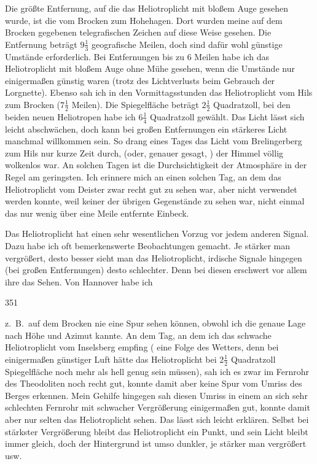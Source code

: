 \par\noindent\hspace*{\parindent}Die größte Entfernung, auf die das Heliotroplicht mit bloßem Auge gesehen wurde, ist die vom Brocken zum Hohehagen. Dort wurden meine auf dem Brocken gegebenen telegrafischen Zeichen auf diese Weise gesehen. Die Entfernung beträgt \(9\frac{1}{3}\) geografische Meilen, doch sind dafür wohl günstige Umstände erforderlich.
Bei Entfernungen bis zu 6 Meilen habe ich das Heliotroplicht mit bloßem Auge ohne Mühe gesehen, wenn die Umstände nur einigermaßen günstig waren (trotz des Lichtverlusts beim Gebrauch der Lorgnette). Ebenso sah ich in den Vormittagsstunden das Heliotroplicht vom Hils zum Brocken (\(7\frac{1}{2}\) Meilen).
Die Spiegelfläche beträgt \(2\frac{1}{2}\) Quadratzoll, bei den beiden neuen Heliotropen habe ich \(6\frac{1}{4}\) Quadratzoll gewählt. Das Licht lässt sich leicht abschwächen, doch kann bei großen Entfernungen ein stärkeres Licht manchmal willkommen sein. So drang eines Tages das Licht vom Brelingerberg zum Hils nur kurze Zeit durch,  (oder, genauer gesagt, ) der Himmel völlig wolkenlos war.
An solchen Tagen ist die Durchsichtigkeit der Atmosphäre in der Regel am geringsten. Ich erinnere mich an einen solchen Tag, an dem das Heliotroplicht vom Deister zwar recht gut zu sehen war, aber nicht verwendet werden konnte, weil keiner der übrigen Gegenstände zu sehen war, nicht einmal das nur wenig über eine Meile entfernte Einbeck.

\par\noindent\hspace*{\parindent}Das Heliotroplicht hat einen sehr wesentlichen Vorzug vor jedem anderen Signal. Dazu habe ich oft bemerkenswerte Beobachtungen gemacht. Je stärker man vergrößert, desto besser sieht man das Heliotroplicht, irdische Signale hingegen (bei großen Entfernungen) desto schlechter. Denn bei diesen erschwert vor allem ihre  das Sehen. Von Hannover habe ich
\par\clearpage
{}\hfill351\par\medskip
\noindent z.~B.\ auf dem Brocken nie eine Spur sehen können, obwohl ich die genaue Lage nach Höhe und Azimut kannte.
An dem Tag, an dem ich das schwache Heliotroplicht vom Inselsberg empfing ( eine Folge des Wetters, denn bei einigermaßen günstiger Luft hätte das Heliotroplicht bei \(2\frac{1}{2}\) Quadratzoll Spiegelfläche noch mehr als hell genug sein müssen), sah ich es zwar im Fernrohr des Theodoliten noch recht gut, konnte damit aber keine Spur vom Umriss des Berges erkennen. Mein Gehilfe hingegen sah diesen Umriss in einem an sich sehr schlechten Fernrohr mit schwacher Vergrößerung einigermaßen gut, konnte damit aber nur selten das Heliotroplicht sehen.
Das lässt sich leicht erklären. Selbst bei stärkster Vergrößerung bleibt das Heliotroplicht ein Punkt, und sein Licht bleibt immer gleich, doch der Hintergrund ist umso dunkler, je stärker man vergrößert usw.

